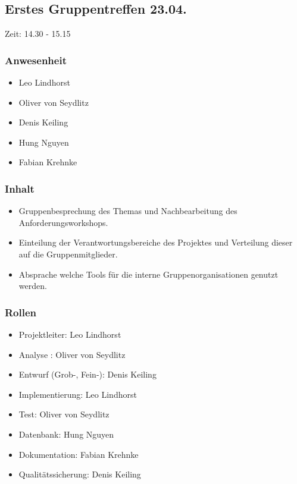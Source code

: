 \subsection{Erstes Gruppentreffen 23.04.}

Zeit: 14.30 - 15.15 

\subsubsection{Anwesenheit}
\begin{itemize}
	\item Leo Lindhorst
	\item Oliver von Seydlitz
	\item Denis Keiling
	\item Hung Nguyen
	\item Fabian Krehnke
\end{itemize}

\subsubsection{Inhalt}
\begin{itemize}
\item Gruppenbesprechung des Themas und Nachbearbeitung des Anforderungsworkshops. 
\item Einteilung der Verantwortungsbereiche des Projektes und 
Verteilung dieser auf die Gruppenmitglieder.
\item Absprache welche Tools für die interne Gruppenorganisationen genutzt werden. 
\end{itemize}

\subsubsection{Rollen}
\begin{itemize}
	\item Projektleiter: Leo Lindhorst
	\item Analyse : Oliver von Seydlitz
	\item Entwurf (Grob-, Fein-): Denis Keiling
	\item Implementierung: Leo Lindhorst
	\item Test: Oliver von Seydlitz
	\item Datenbank: Hung Nguyen
	\item Dokumentation: Fabian Krehnke 
	\item Qualitätssicherung: Denis Keiling 
\end{itemize}

